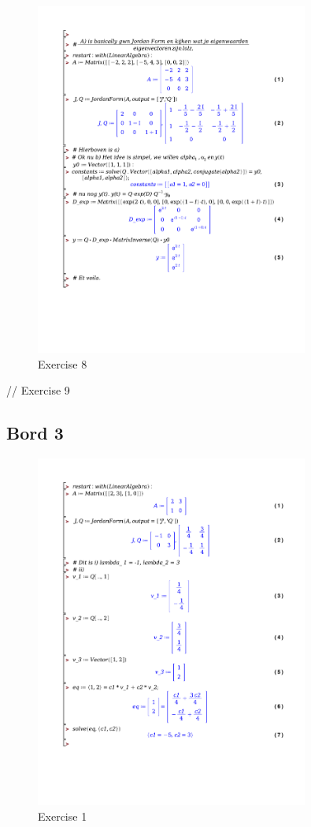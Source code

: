 \documentclass[a4paper]{article}
\begin{document}
\begin{figure}[H]
	\centering
	\includegraphics[width=0.8\textwidth]{exercises/huis_3_ex_8.pdf}
	\caption{Exercise 8}
	\label{fig:huis_3_ex_8}
\end{figure}

// Exercise 9


\subsection*{Bord 3}

\begin{figure}[H]
	\centering
	\includegraphics[width=0.8\textwidth]{exercises/bord_3_ex_1.pdf}
	\caption{Exercise 1}
	\label{fig:bord_3_ex_1}
\end{figure}
\end{document}
